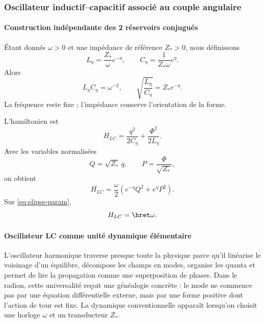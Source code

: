 \subsubsection{Oscillateur inductif--capacitif associé au couple angulaire}

\paragraph{Construction indépendante des 2 réservoirs conjugués}

Étant donnés \(\omega>0\) et une impédance de référence \(Z_*>0\), nous définissons
\begin{equation}
L_\eta=\frac{Z_*}{\omega}e^{-\eta},
\qquad
C_\eta=\frac{1}{Z_*\omega}e^\eta.
\label{eq:LC-def}
\end{equation}
Alors
\begin{equation}
L_\eta C_\eta=\omega^{-2},
\qquad
\sqrt{\frac{L_\eta}{C_\eta}}=Z_*e^{-\eta}.
\label{eq:LC-invariants}
\end{equation}
La fréquence reste fixe ; l'impédance conserve l'orientation de la
forme.

L'hamiltonien est
\begin{equation}
H_{LC}=\frac{q^2}{2C_\eta}+\frac{\Phi^2}{2L_\eta}.
\label{eq:HLC}
\end{equation}
Avec les variables normalisées
\begin{equation}
Q=\sqrt{Z_*}\,q,\qquad
P=\frac{\Phi}{\sqrt{Z_*}},
\label{eq:LC-map}
\end{equation}
on obtient
\begin{equation}
H_{LC}=\frac\omega2
\left(e^{-\eta}Q^2+e^\eta P^2\right).
\label{eq:HLC-QP}
\end{equation}
Sur \eqref{eq:elipse-param},
\begin{equation}
H_{LC}=\hret\omega.
\label{eq:LC-level}
\end{equation}

\paragraph{Oscillateur LC comme unité dynamique élémentaire}

L'oscillateur harmonique traverse presque toute la physique parce qu'il linéarise le
voisinage d'un équilibre, décompose les champs en modes, organise les quanta et
permet de lire la propagation comme une superposition de phases. Dans le radion, cette
universalité reçoit une généalogie concrète : le mode ne commence pas par une
équation différentielle externe, mais par une forme positive dont l'action de tour est
fixe. La dynamique conventionnelle apparaît lorsqu'on choisit une horloge \(\omega\) et un
transducteur \(Z_*\).

